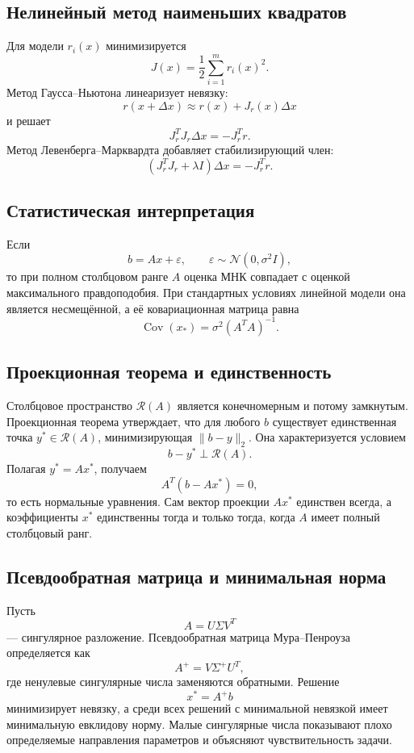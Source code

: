\subsection{Нелинейный метод наименьших квадратов}

Для модели $r_i(x)$ минимизируется
\[
    J(x)=\frac12\sum_{i=1}^{m}r_i(x)^2.
\]
Метод Гаусса--Ньютона линеаризует невязку:
\[
    r(x+\Delta x)\approx r(x)+J_r(x)\Delta x
\]
и решает
\[
    J_r^TJ_r\Delta x=-J_r^Tr.
\]
Метод Левенберга--Марквардта добавляет стабилизирующий член:
\[
    (J_r^TJ_r+\lambda I)\Delta x=-J_r^Tr.
\]

\subsection{Статистическая интерпретация}

Если
\[
    b=Ax+\varepsilon,
    \qquad
    \varepsilon\sim\mathcal N(0,\sigma^2I),
\]
то при полном столбцовом ранге $A$ оценка МНК совпадает с оценкой максимального
правдоподобия. При стандартных условиях линейной модели она является несмещённой,
а её ковариационная матрица равна
\[
    \operatorname{Cov}(x_*)=\sigma^2(A^TA)^{-1}.
\]

\subsection{Проекционная теорема и единственность}

Столбцовое пространство $\mathcal R(A)$ является конечномерным и потому замкнутым.
Проекционная теорема утверждает, что для любого $b$ существует единственная точка
$y^*\in\mathcal R(A)$, минимизирующая $\|b-y\|_2$. Она характеризуется условием
\[
    b-y^*\perp \mathcal R(A).
\]
Полагая $y^*=Ax^*$, получаем
\[
    A^T(b-Ax^*)=0,
\]
то есть нормальные уравнения. Сам вектор проекции $Ax^*$ единствен всегда, а коэффициенты
$x^*$ единственны тогда и только тогда, когда $A$ имеет полный столбцовый ранг.

\subsection{Псевдообратная матрица и минимальная норма}

Пусть
\[
    A=U\Sigma V^T
\]
--- сингулярное разложение. Псевдообратная матрица Мура--Пенроуза определяется как
\[
    A^+=V\Sigma^+U^T,
\]
где ненулевые сингулярные числа заменяются обратными. Решение
\[
    x^*=A^+b
\]
минимизирует невязку, а среди всех решений с минимальной невязкой имеет минимальную
евклидову норму. Малые сингулярные числа показывают плохо определяемые направления
параметров и объясняют чувствительность задачи.

